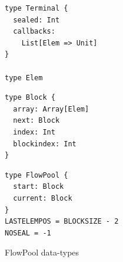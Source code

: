\begin{figure}[t]

\centering

\begin{minipage}[t]{4.3 cm}
\begin{verbatim}
type Terminal {
  sealed: Int
  callbacks:
    List[Elem => Unit]
}

type Elem
\end{verbatim}
\end{minipage}
\begin{minipage}[t]{4 cm}
\begin{verbatim}
type Block {
  array: Array[Elem]
  next: Block
  index: Int
  blockindex: Int
}
\end{verbatim}
\end{minipage}
\begin{minipage}[t]{5 cm}
\begin{verbatim}
type FlowPool {
  start: Block
  current: Block
}
LASTELEMPOS = BLOCKSIZE - 2
NOSEAL = -1
\end{verbatim}
\end{minipage}

\caption{FlowPool data-types}
\label{f-datatypes}
\end{figure}

\setlength\linenumbersep{2pt}


